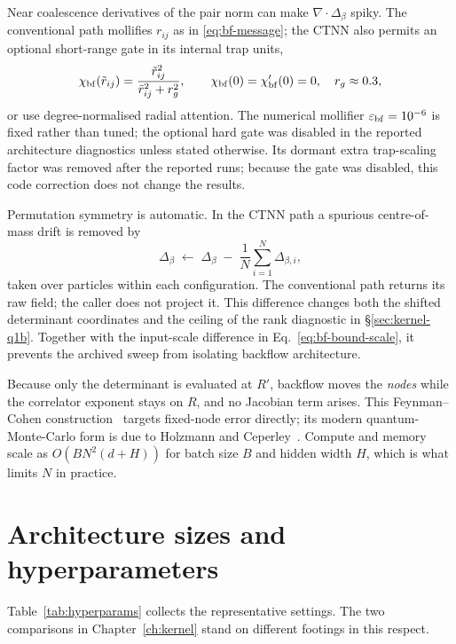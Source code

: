 Near coalescence derivatives of the pair norm can make $\nabla\!\cdot\!\Delta_\beta$ spiky.
The conventional path mollifies $r_{ij}$ as in \eqref{eq:bf-message}; the CTNN also permits
an optional short-range gate in its internal trap units,
\begin{equation}
  \chi_{\rm bf}(\tilde r_{ij})=\frac{\tilde r_{ij}^2}{\tilde r_{ij}^2+r_g^2},
  \qquad \chi_{\rm bf}(0)=\chi'_{\rm bf}(0)=0,\quad r_g\approx 0.3,
  \label{eq:bf-gate}
\end{equation}
or use degree-normalised radial attention. The numerical mollifier
$\varepsilon_{\rm bf}=10^{-6}$ is fixed rather than tuned; the optional hard gate was disabled
in the reported architecture diagnostics unless stated otherwise. Its dormant extra
trap-scaling factor was removed after the reported runs; because the gate was disabled, this
code correction does not change the results.

Permutation symmetry is automatic. In the CTNN path a spurious centre-of-mass drift is
removed by
\begin{equation}
  \Delta_\beta \;\leftarrow\; \Delta_\beta \;-\; \frac{1}{N}\sum_{i=1}^N \Delta_{\beta,i},
  \label{eq:bf-com}
\end{equation}
taken over particles within each configuration. The conventional path returns its raw field;
the caller does not project it. This difference changes both the shifted determinant
coordinates and the ceiling of the rank diagnostic in \S\ref{sec:kernel-q1b}. Together with
the input-scale difference in Eq.~\eqref{eq:bf-bound-scale}, it prevents the archived sweep
from isolating backflow architecture.

Because only the determinant is evaluated at $R'$, backflow moves the \emph{nodes}
while the correlator exponent stays on $R$, and no Jacobian term arises. This
Feynman--Cohen construction~\cite{FeynmanCohen1956-Backflow} targets fixed-node error
directly; its modern quantum-Monte-Carlo form is due to Holzmann and
Ceperley~\cite{HolzmannCeperley2003-Backflow}. Compute and memory scale as
$O(BN^2(d+H))$ for batch size $B$ and hidden width $H$, which is what limits $N$ in practice.


\section{Architecture sizes and hyperparameters}
\label{sec:hyperparameters}
Table~\ref{tab:hyperparams} collects the representative settings. The two comparisons in
Chapter~\ref{ch:kernel} stand on different footings in this respect.

